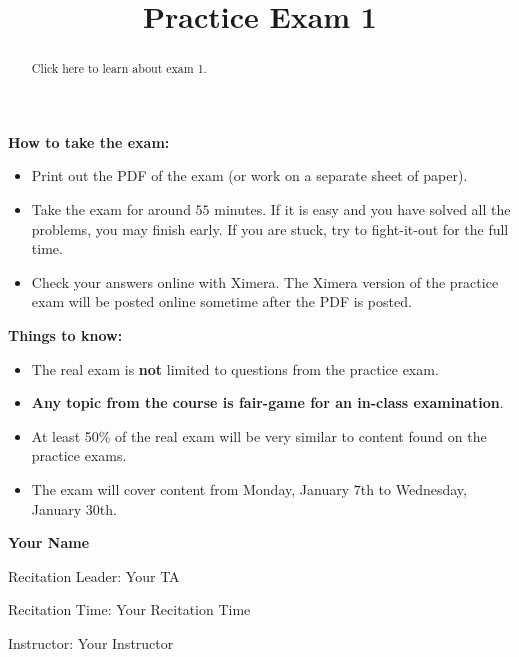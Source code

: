 \documentclass{ximera}
\title{Practice Exam 1}
\begin{document}
\begin{abstract}
Click here to learn about exam 1.
\end{abstract}
\maketitle

\thispagestyle{empty}


\vfill

\textbf{How to take the exam:}
\begin{itemize}
  \item Print out the PDF of the exam (or work on a separate sheet of paper).
  \item Take the exam for around $55$ minutes. If it is easy and you
    have solved all the problems, you may finish early. If you are
    stuck, try to fight-it-out for the full time.
  \item Check your answers online with Ximera. The Ximera version of
    the practice exam will be posted online sometime after the PDF is
    posted.
\end{itemize}

\textbf{Things to know:}
\begin{itemize}
\item The real exam is \textbf{not} limited to questions from the practice
  exam.
\item \textbf{Any topic from the course is fair-game for an in-class
  examination}.
\item At least 50\% of the real exam will be very similar to content
  found on the practice exams.
\item The exam will cover content from Monday, January $7$th to
  Wednesday, January $30$th.
\end{itemize}

\noindent\textsf{{\fontsize{32}{36}\textbf{Your Name}}} 

\vspace{1cm}

\noindent\textsf{\large Recitation Leader: Your TA} 


\noindent\textsf{\large Recitation Time: Your Recitation Time} 


\noindent\textsf{\large Instructor: Your Instructor}


\end{document}
